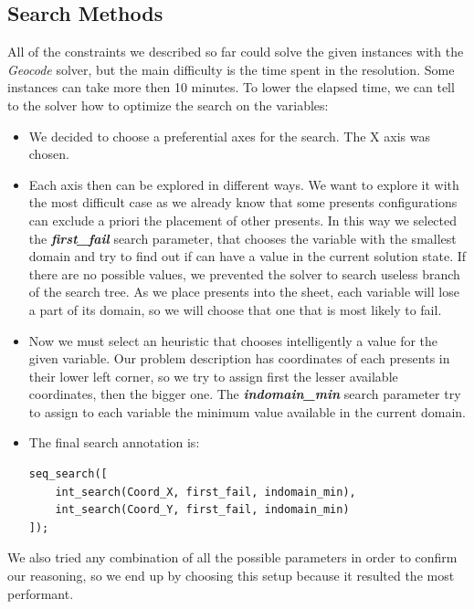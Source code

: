 \subsection{Search Methods}
All of the constraints we described so far could solve the given instances with the \textit{Geocode} solver,
but the main difficulty is the time spent in the resolution. Some instances can take more then 10 minutes.
To lower the elapsed time, we can tell to the solver how to optimize the search on the variables:
\begin{itemize}
    \item We decided to choose a preferential axes for the search. The X axis was chosen.
    \item Each axis then can be explored in different ways. We want to explore it with the most difficult case
        as we already know that some presents configurations can exclude a priori the placement of other presents.
        In this way we selected the \textit{\textbf{first\_fail}} search parameter, that chooses the variable with
        the smallest domain and try to find out if can have a value in the current solution state.
        If there are no possible values, we prevented the solver to search useless branch of the search tree.
        As we place presents into the sheet, each variable will lose a part of its domain, so we will choose that
        one that is most likely to fail.
    \item Now we must select an heuristic that chooses intelligently a value for the given variable. Our problem
        description has coordinates of each presents in their lower left corner, so we try to assign first the lesser
        available coordinates, then the bigger one. The \textit{\textbf{indomain\_min}} search parameter try to assign
        to each variable the minimum value available in the current domain.
    \item The final search annotation is:
    \begin{lstlisting}
seq_search([
    int_search(Coord_X, first_fail, indomain_min),
    int_search(Coord_Y, first_fail, indomain_min)
]);
    \end{lstlisting}
\end{itemize} 

We also tried any combination of all the possible parameters in order to confirm our reasoning, so we end up by choosing
this setup because it resulted the most performant.



